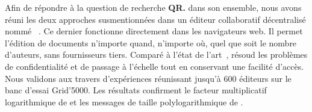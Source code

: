 Afin de répondre à la question de recherche \textbf{QR.} dans son ensemble, nous
avons réuni les deux approches susmentionnées dans un éditeur collaboratif
décentralisé nommé \CRATE~\cite{nedelec2016crate}. Ce dernier fonctionne
directement dans les navigateurs web. Il permet l'édition de documents n'importe
quand, n'importe où, quel que soit le nombre d'auteurs, sans fournisseurs
tiers. Comparé à l'état de l'art~\cite{etherpad, googledocs, hivejs,
  lautamaki2012cored, nicolaescu2015yjs}, \CRATE résoud les problèmes de
confidentialité et de passage à l'échelle tout en conservant une facilité
d'accès. Nous validons \CRATE aux travers d'expériences réunissant jusqu'à 600
éditeurs sur le banc d'essai Grid'5000. Les résultats confirment le facteur
multiplicatif logarithmique de \SPRAY et les messages de taille
polylogarithmique de \LSEQ.



